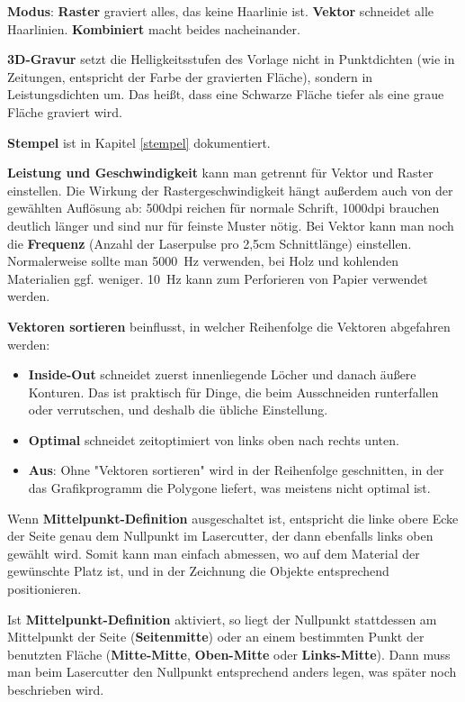 \documentclass{\basedir/fablab-document}
\begin{document}
	\textbf{Modus}: \textbf{Raster} graviert alles, das keine Haarlinie ist. \textbf{Vektor} schneidet alle Haarlinien. \textbf{Kombiniert} macht beides nacheinander.

	\textbf{3D-Gravur} setzt die Helligkeitsstufen des Vorlage nicht in Punktdichten (wie in Zeitungen, entspricht der Farbe der gravierten Fläche), sondern in Leistungsdichten um. Das heißt, dass eine Schwarze Fläche tiefer als eine graue Fläche graviert wird.

	\textbf{Stempel} ist in Kapitel \ref{stempel} dokumentiert.

	\textbf{Leistung und Geschwindigkeit} kann man getrennt für Vektor und Raster einstellen. Die Wirkung der Rastergeschwindigkeit hängt außerdem auch von der gewählten Auflösung ab: 500dpi reichen für normale Schrift, 1000dpi brauchen deutlich länger und sind nur für feinste Muster nötig. Bei Vektor kann man noch die \textbf{Frequenz} (Anzahl der Laserpulse pro 2,5cm Schnittlänge) einstellen. Normalerweise sollte man 5000~Hz verwenden, bei Holz und kohlenden Materialien ggf. weniger. 10~Hz kann zum Perforieren von Papier verwendet werden. %

	\textbf{Vektoren sortieren} beinflusst, in welcher Reihenfolge die Vektoren abgefahren werden:
	\begin{itemize}
		\item \textbf{Inside-Out} schneidet zuerst innenliegende Löcher und danach äußere Konturen.  Das ist praktisch für Dinge, die beim Ausschneiden runterfallen oder verrutschen, und deshalb die übliche Einstellung.
		\item \textbf{Optimal} schneidet zeitoptimiert von links oben nach rechts unten.
		\item \textbf{Aus}: Ohne "Vektoren sortieren" wird in der Reihenfolge geschnitten, in der das Grafikprogramm die Polygone liefert, was meistens nicht optimal ist.
	\end{itemize}


	Wenn \textbf{Mittelpunkt-Definition} ausgeschaltet ist, entspricht die linke obere Ecke der Seite genau dem Nullpunkt im Lasercutter, der dann ebenfalls links oben gewählt wird. Somit kann man einfach abmessen, wo auf dem Material der gewünschte Platz ist, und in der Zeichnung die Objekte entsprechend positionieren.

	Ist \textbf{Mittelpunkt-Definition} aktiviert, so liegt der Nullpunkt stattdessen am Mittelpunkt der Seite (\textbf{Seiten\-mitte}) oder an einem bestimmten Punkt der benutzten Fläche (\textbf{Mitte-Mitte}, \textbf{Oben-Mitte} oder \textbf{Links-Mitte}). Dann muss man beim Lasercutter den Nullpunkt entsprechend anders legen, was später noch beschrieben wird.
\end{document}
